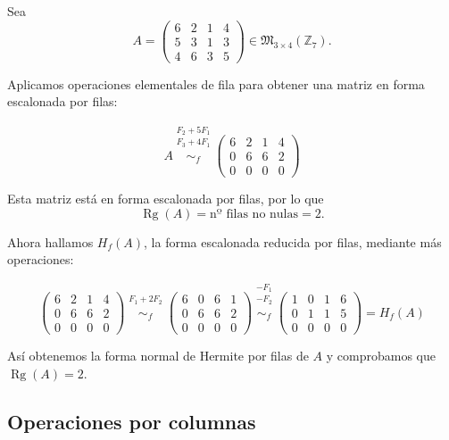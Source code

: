 \documentclass[a4paper,12pt]{article}
\begin{document}
\begin{ejemplo}[title=Ejemplo de cálculo del rango por filas]
Sea
\[
A =
\begin{pmatrix}
6 & 2 & 1 & 4 \\
5 & 3 & 1 & 3 \\
4 & 6 & 3 & 5
\end{pmatrix} \in \mathfrak{M}_{3 \times 4}(\mathbb{Z}_7).
\]

Aplicamos operaciones elementales de fila para obtener una matriz en forma escalonada por filas:

\[
A \overset{\substack{F_2 + 5 F_1 \\ F_3 + 4 F_1\\{}}}{\sim_f}
\begin{pmatrix}
6 & 2 & 1 & 4 \\
0 & 6 & 6 & 2 \\
0 & 0 & 0 & 0
\end{pmatrix}
\]

Esta matriz está en forma escalonada por filas, por lo que
\[
\operatorname{Rg}(A) = \text{nº filas no nulas} = 2.
\]

Ahora hallamos $H_f(A)$, la forma escalonada reducida por filas, mediante más operaciones:

\[
\begin{pmatrix}
6 & 2 & 1 & 4 \\
0 & 6 & 6 & 2 \\
0 & 0 & 0 & 0
\end{pmatrix}
\overset{\substack{F_1 +2F_2 \\{}}}{\sim_f}
\begin{pmatrix}
6 & 0 & 6 & 1 \\
0 & 6 & 6 & 2 \\
0 & 0 & 0 & 0
\end{pmatrix}
\overset{\substack{-F_1\\-F_2\\{}}}{\sim_f}
\begin{pmatrix}
1 & 0 & 1 & 6 \\
0 & 1 & 1 & 5 \\
0 & 0 & 0 & 0
\end{pmatrix}
= H_f(A)
\]

Así obtenemos la forma normal de Hermite por filas de $A$ y comprobamos que $\operatorname{Rg}(A) = 2$.
\end{ejemplo}

\subsection{Operaciones por columnas}
\end{document}
